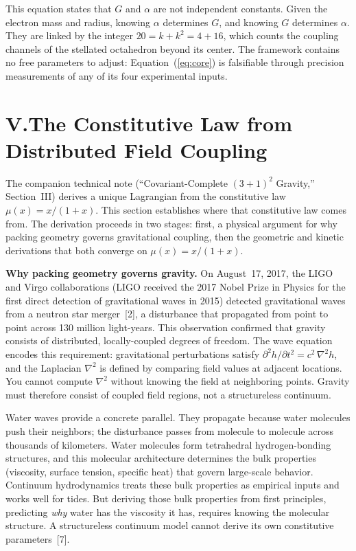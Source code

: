 \documentclass[11pt]{article}
\begin{document}
This equation states that $G$ and $\alpha$ are not independent constants.
Given the electron mass and radius, knowing $\alpha$ determines $G$, and knowing $G$ determines $\alpha$.
They are linked by the integer $20 = k + k^2 = 4 + 16$, which counts the coupling channels of the stellated octahedron beyond its center.
The framework contains no free parameters to adjust: Equation~(\ref{eq:core}) is falsifiable through precision measurements of any of its four experimental inputs.

\section*{V.\quad The Constitutive Law from Distributed Field Coupling}

The companion technical note (``Covariant-Complete $(3+1)^2$ Gravity,'' Section~III) derives a unique Lagrangian from the constitutive law $\mu(x) = x/(1+x)$.
This section establishes where that constitutive law comes from.
The derivation proceeds in two stages: first, a physical argument for why packing geometry governs gravitational coupling, then the geometric and kinetic derivations that both converge on $\mu(x) = x/(1+x)$.


\textbf{Why packing geometry governs gravity.}\quad
On August~17, 2017, the LIGO and Virgo collaborations (LIGO received the 2017 Nobel Prize in Physics for the first direct detection of gravitational waves in 2015) detected gravitational waves from a neutron star merger~[2], a disturbance that propagated from point to point across 130 million light-years.
This observation confirmed that gravity consists of distributed, locally-coupled degrees of freedom.
The wave equation encodes this requirement: gravitational perturbations satisfy $\partial^2 h / \partial t^2 = c^2\,\nabla^2 h$, and the Laplacian $\nabla^2$ is defined by comparing field values at adjacent locations.
You cannot compute $\nabla^2$ without knowing the field at neighboring points.
Gravity must therefore consist of coupled field regions, not a structureless continuum.

Water waves provide a concrete parallel.
They propagate because water molecules push their neighbors; the disturbance passes from molecule to molecule across thousands of kilometers.
Water molecules form tetrahedral hydrogen-bonding structures, and this molecular architecture determines the bulk properties (viscosity, surface tension, specific heat) that govern large-scale behavior.
Continuum hydrodynamics treats these bulk properties as empirical inputs and works well for tides.
But deriving those bulk properties from first principles, predicting \emph{why} water has the viscosity it has, requires knowing the molecular structure.
A structureless continuum model cannot derive its own constitutive parameters~[7].
\end{document}

